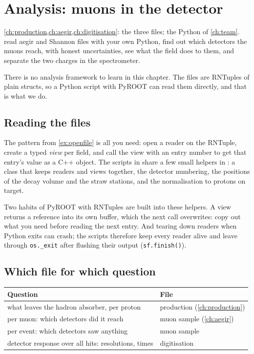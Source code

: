 \chapter{Analysis: muons in the detector}
\label{ch:analysis}

{\cref{ch:production,ch:aegir,ch:digitisation}: the three files; the Python of
\cref{ch:team}.}
{read aegir and Shannon files with your own Python, find out which
detectors the muons reach, with honest uncertainties, see what the field does
to them, and separate the two charges in the spectrometer.}

There is no analysis framework to learn in this chapter. The files are
RNTuples of plain structs, so a Python script with PyROOT can read them
directly, and that is what we do.

\section{Reading the files}

The pattern from \cref{ex:openfile} is all you need: open a reader on the
RNTuple, create a typed \emph{view} per field, and call the view with an entry
number to get that entry's value as a C++ object. The scripts in
 share a few small helpers in : a
class that keeps readers and views together, the detector numbering, the
positions of the decay volume and the straw stations, and the normalisation
to protons on target.


\begin{pitfall}
Two habits of PyROOT with RNTuples are built into these helpers. A view
returns a reference into its own buffer, which the next call overwrites: copy
out what you need before reading the next entry. And tearing down readers
when Python exits can crash; the scripts therefore keep every reader alive and
leave through \texttt{os.\_exit} after flushing their output
(\texttt{sf.finish()}).
\end{pitfall}

\section{Which file for which question}

\begin{center}
\small
\begin{tabularx}{\linewidth}{X l}
\toprule
Question & File \\
\midrule
what leaves the hadron absorber, per proton & production (\cref{ch:production}) \\
per muon: which detectors did it reach & muon sample (\cref{ch:aegir}) \\
per event: which detectors saw anything & muon sample \\
detector response over all hits: resolutions, times & digitisation \\
\bottomrule
\end{tabularx}
\end{center}

